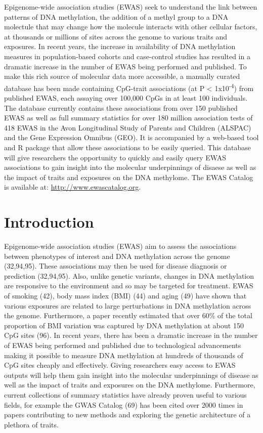 \documentclass[11pt,twoside]{bristolthesis}
\begin{document}
Epigenome-wide association studies (EWAS) seek to understand the link between patterns of DNA methylation, the addition of a methyl group to a DNA molectule that may change how the molecule interacts with other cellular factors, at thousands or millions of sites across the genome to various traits and exposures. In recent years, the increase in availability of DNA methylation measures in population-based cohorts and case-control studies has resulted in a dramatic increase in the number of EWAS being performed and published. To make this rich source of molecular data more accessible, a manually curated database has been made containing CpG-trait associations (at P \textless{} 1x10\textsuperscript{-4}) from published EWAS, each assaying over 100,000 CpGs in at least 100 individuals. The database currently contains these associations from over 150 published EWAS as well as full summary statistics for over 180 million association tests of 418 EWAS in the Avon Longitudinal Study of Parents and Children (ALSPAC) and the Gene Expression Omnibus (GEO). It is accompanied by a web-based tool and R package that allow these associations to be easily queried. This database will give researchers the opportunity to quickly and easily query EWAS associations to gain insight into the molecular underpinnings of disaese as well as the impact of traits and exposures on the DNA methylome. The EWAS Catalog is available at: \url{http://www.ewascatalog.org}.

\hypertarget{introduction-1}{%
\section{Introduction}\label{introduction-1}}

Epigenome-wide association studies (EWAS) aim to assess the associations between phenotypes of interest and DNA methylation across the genome (32,94,95). These associations may then be used for disease diagnosis or prediction (32,94,95). Also, unlike genetic variants, changes in DNA methylation are responsive to the environment and so may be targeted for treatment. EWAS of smoking (42), body mass index (BMI) (44) and aging (49) have shown that various exposures are related to large perturbations in DNA methylation across the genome. Furthermore, a paper recently estimated that over 60\% of the total proportion of BMI variation was captured by DNA methylation at about 150 CpG sites (96). In recent years, there has been a dramatic increase in the number of EWAS being performed and published due to technological advancements making it possible to measure DNA methylation at hundreds of thousands of CpG sites cheaply and effectively. Giving researchers easy access to EWAS outputs will help them gain insight into the molecular underpinnings of disease as well as the impact of traits and exposures on the DNA methylome. Furthermore, current collections of summary statistics have already proven useful to various fields, for example the GWAS Catalog (69) has been cited over 2000 times in papers contributing to new methods and exploring the genetic architecture of a plethora of traits.
\end{document}
